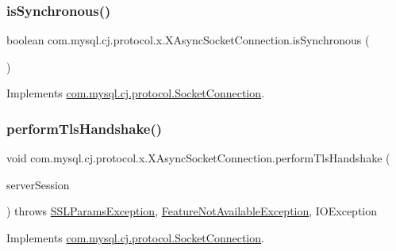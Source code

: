 \subsubsection{\texorpdfstring{is\+Synchronous()}{isSynchronous()}}
{\footnotesize\ttfamily boolean com.\+mysql.\+cj.\+protocol.\+x.\+X\+Async\+Socket\+Connection.\+is\+Synchronous (\begin{DoxyParamCaption}{ }\end{DoxyParamCaption})}



Implements \mbox{\hyperlink{interfacecom_1_1mysql_1_1cj_1_1protocol_1_1_socket_connection_a89c2521893554b7052f9e92cdd73c527}{com.\+mysql.\+cj.\+protocol.\+Socket\+Connection}}.

\mbox{\label{classcom_1_1mysql_1_1cj_1_1protocol_1_1x_1_1_x_async_socket_connection_a3e9822eb06f30e59addd9965056237c1}} 
\subsubsection{\texorpdfstring{perform\+Tls\+Handshake()}{performTlsHandshake()}}
{\footnotesize\ttfamily void com.\+mysql.\+cj.\+protocol.\+x.\+X\+Async\+Socket\+Connection.\+perform\+Tls\+Handshake (\begin{DoxyParamCaption}\item[{\mbox{\hyperlink{interfacecom_1_1mysql_1_1cj_1_1protocol_1_1_server_session}{Server\+Session}}}]{server\+Session }\end{DoxyParamCaption}) throws \mbox{\hyperlink{classcom_1_1mysql_1_1cj_1_1exceptions_1_1_s_s_l_params_exception}{S\+S\+L\+Params\+Exception}}, \mbox{\hyperlink{classcom_1_1mysql_1_1cj_1_1exceptions_1_1_feature_not_available_exception}{Feature\+Not\+Available\+Exception}}, I\+O\+Exception}



Implements \mbox{\hyperlink{interfacecom_1_1mysql_1_1cj_1_1protocol_1_1_socket_connection_a15064c0de5e729be5f27a42aee58fdd5}{com.\+mysql.\+cj.\+protocol.\+Socket\+Connection}}.

